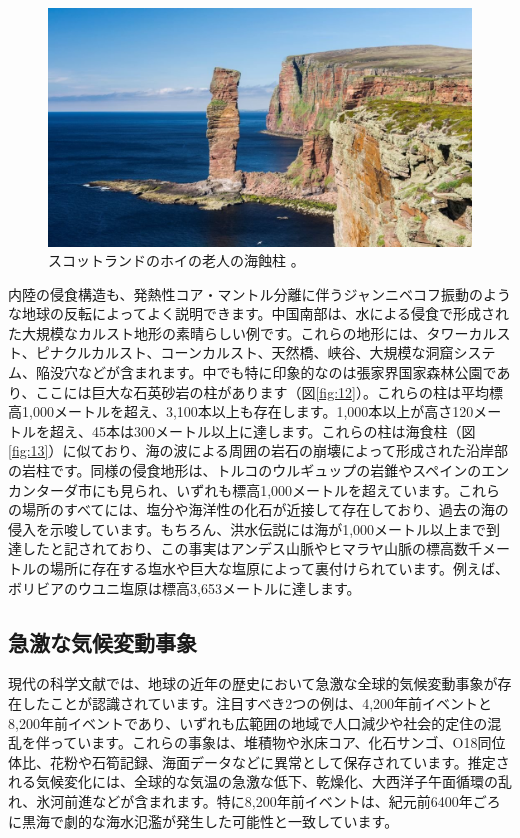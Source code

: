 \documentclass[10pt,twocolumn,letterpaper]{article}
\begin{document}
\begin{figure}[t]
\begin{center}
   \includegraphics[width=1\linewidth]{hoy.jpg}
\end{center}
   \caption{スコットランドのホイの老人の海蝕柱 \cite{83}。}
\label{fig:13}
\label{fig:onecol}
\end{figure}
内陸の侵食構造も、発熱性コア・マントル分離に伴うジャンニベコフ振動のような地球の反転によってよく説明できます。中国南部は、水による侵食で形成された大規模なカルスト地形の素晴らしい例です\cite{82}。これらの地形には、タワーカルスト、ピナクルカルスト、コーンカルスト、天然橋、峡谷、大規模な洞窟システム、陥没穴などが含まれます。中でも特に印象的なのは張家界国家森林公園であり、ここには巨大な石英砂岩の柱があります（図\ref{fig:12}）\cite{84}。これらの柱は平均標高1,000メートルを超え、3,100本以上も存在します。1,000本以上が高さ120メートルを超え、45本は300メートル以上に達します\cite{85}。これらの柱は海食柱（図\ref{fig:13}）に似ており、海の波による周囲の岩石の崩壊によって形成された沿岸部の岩柱です。同様の侵食地形は、トルコのウルギュップの岩錐やスペインのエンカンターダ市にも見られ、いずれも標高1,000メートルを超えています。これらの場所のすべてには、塩分や海洋性の化石が近接して存在しており、過去の海の侵入を示唆しています\cite{15,86,87}。もちろん、洪水伝説\cite{3}には海が1,000メートル以上まで到達したと記されており、この事実はアンデス山脈やヒマラヤ山脈の標高数千メートルの場所に存在する塩水や巨大な塩原によって裏付けられています。例えば、ボリビアのウユニ塩原は標高3,653メートルに達します\cite{94}。

\subsection{急激な気候変動事象}

現代の科学文献では、地球の近年の歴史において急激な全球的気候変動事象が存在したことが認識されています。注目すべき2つの例は、4,200年前イベントと8,200年前イベントであり、いずれも広範囲の地域で人口減少や社会的定住の混乱を伴っています。これらの事象は、堆積物や氷床コア、化石サンゴ、O18同位体比、花粉や石筍記録、海面データなどに異常として保存されています。推定される気候変化には、全球的な気温の急激な低下、乾燥化、大西洋子午面循環の乱れ、氷河前進などが含まれます\cite{90,91,92}。特に8,200年前イベントは、紀元前6400年ごろに黒海で劇的な海水氾濫が発生した可能性と一致しています\cite{93}。
\end{document}
